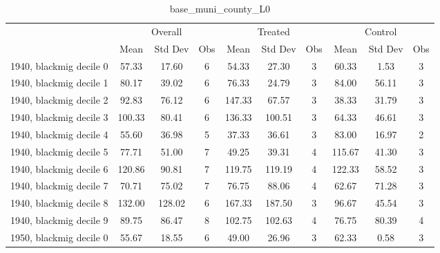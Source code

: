 \begin{table}[htbp]\centering
\def\sym#1{\ifmmode^{#1}\else\(^{#1}\)\fi}
\caption{base\_muni\_county\_L0 \label{tab1}}
\begin{tabular}{l*{3}{ccc}}
\toprule
                    &\multicolumn{3}{c}{Overall}           &\multicolumn{3}{c}{Treated}           &\multicolumn{3}{c}{Control}           \\
                    &        Mean&     Std Dev&         Obs&        Mean&     Std Dev&         Obs&        Mean&     Std Dev&         Obs\\
\midrule
1940, blackmig decile 0&       57.33&       17.60&           6&       54.33&       27.30&           3&       60.33&        1.53&           3\\
1940, blackmig decile 1&       80.17&       39.02&           6&       76.33&       24.79&           3&       84.00&       56.11&           3\\
1940, blackmig decile 2&       92.83&       76.12&           6&      147.33&       67.57&           3&       38.33&       31.79&           3\\
1940, blackmig decile 3&      100.33&       80.41&           6&      136.33&      100.51&           3&       64.33&       46.61&           3\\
1940, blackmig decile 4&       55.60&       36.98&           5&       37.33&       36.61&           3&       83.00&       16.97&           2\\
1940, blackmig decile 5&       77.71&       51.00&           7&       49.25&       39.31&           4&      115.67&       41.30&           3\\
1940, blackmig decile 6&      120.86&       90.81&           7&      119.75&      119.19&           4&      122.33&       58.52&           3\\
1940, blackmig decile 7&       70.71&       75.02&           7&       76.75&       88.06&           4&       62.67&       71.28&           3\\
1940, blackmig decile 8&      132.00&      128.02&           6&      167.33&      187.50&           3&       96.67&       45.54&           3\\
1940, blackmig decile 9&       89.75&       86.47&           8&      102.75&      102.63&           4&       76.75&       80.39&           4\\
1950, blackmig decile 0&       55.67&       18.55&           6&       49.00&       26.96&           3&       62.33&        0.58&           3\\

\end{tabular}
\end{table}
